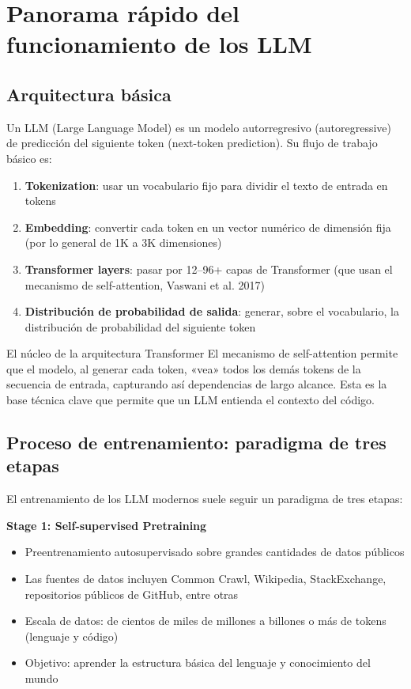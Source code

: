 \section{Panorama rápido del funcionamiento de los LLM}

\subsection{Arquitectura básica}

Un LLM (Large Language Model) es un modelo autorregresivo (autoregressive) de predicción del siguiente token (next-token prediction). Su flujo de trabajo básico es:

\begin{enumerate}
    \item \textbf{Tokenization}: usar un vocabulario fijo para dividir el texto de entrada en tokens
    \item \textbf{Embedding}: convertir cada token en un vector numérico de dimensión fija (por lo general de 1K a 3K dimensiones)
    \item \textbf{Transformer layers}: pasar por 12--96+ capas de Transformer (que usan el mecanismo de self-attention, Vaswani et al. 2017)
    \item \textbf{Distribución de probabilidad de salida}: generar, sobre el vocabulario, la distribución de probabilidad del siguiente token
\end{enumerate}

\begin{knowledgebox}{El núcleo de la arquitectura Transformer}
El mecanismo de self-attention permite que el modelo, al generar cada token, «vea» todos los demás tokens de la secuencia de entrada, capturando así dependencias de largo alcance. Esta es la base técnica clave que permite que un LLM entienda el contexto del código.
\end{knowledgebox}

\subsection{Proceso de entrenamiento: paradigma de tres etapas}

El entrenamiento de los LLM modernos suele seguir un paradigma de tres etapas:

\textbf{Stage 1: Self-supervised Pretraining}
\begin{itemize}
    \item Preentrenamiento autosupervisado sobre grandes cantidades de datos públicos
    \item Las fuentes de datos incluyen Common Crawl, Wikipedia, StackExchange, repositorios públicos de GitHub, entre otras
    \item Escala de datos: de cientos de miles de millones a billones o más de tokens (lenguaje y código)
    \item Objetivo: aprender la estructura básica del lenguaje y conocimiento del mundo
\end{itemize}

